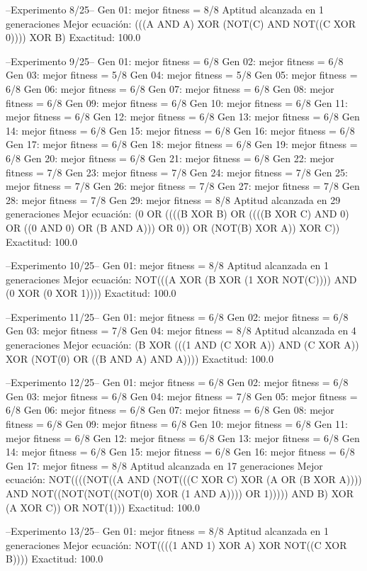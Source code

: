 --Experimento 
 8/25--
Gen 01: mejor fitness = 8/8
Aptitud alcanzada en 1 generaciones
Mejor ecuación: (((A AND A) XOR (NOT(C) AND NOT((C XOR 0)))) XOR B)
 Exactitud: 100.0%

--Experimento 
 9/25--
Gen 01: mejor fitness = 6/8
Gen 02: mejor fitness = 6/8
Gen 03: mejor fitness = 5/8
Gen 04: mejor fitness = 5/8
Gen 05: mejor fitness = 6/8
Gen 06: mejor fitness = 6/8
Gen 07: mejor fitness = 6/8
Gen 08: mejor fitness = 6/8
Gen 09: mejor fitness = 6/8
Gen 10: mejor fitness = 6/8
Gen 11: mejor fitness = 6/8
Gen 12: mejor fitness = 6/8
Gen 13: mejor fitness = 6/8
Gen 14: mejor fitness = 6/8
Gen 15: mejor fitness = 6/8
Gen 16: mejor fitness = 6/8
Gen 17: mejor fitness = 6/8
Gen 18: mejor fitness = 6/8
Gen 19: mejor fitness = 6/8
Gen 20: mejor fitness = 6/8
Gen 21: mejor fitness = 6/8
Gen 22: mejor fitness = 7/8
Gen 23: mejor fitness = 7/8
Gen 24: mejor fitness = 7/8
Gen 25: mejor fitness = 7/8
Gen 26: mejor fitness = 7/8
Gen 27: mejor fitness = 7/8
Gen 28: mejor fitness = 7/8
Gen 29: mejor fitness = 8/8
Aptitud alcanzada en 29 generaciones
Mejor ecuación: (0 OR ((((B XOR B) OR ((((B XOR C) AND 0) OR ((0 AND 0) OR (B AND A))) OR 0)) OR (NOT(B) XOR A)) XOR C))
 Exactitud: 100.0%

--Experimento 
 10/25--
Gen 01: mejor fitness = 8/8
Aptitud alcanzada en 1 generaciones
Mejor ecuación: NOT(((A XOR (B XOR (1 XOR NOT(C)))) AND (0 XOR (0 XOR 1))))
 Exactitud: 100.0%

--Experimento 
 11/25--
Gen 01: mejor fitness = 6/8
Gen 02: mejor fitness = 6/8
Gen 03: mejor fitness = 7/8
Gen 04: mejor fitness = 8/8
Aptitud alcanzada en 4 generaciones
Mejor ecuación: (B XOR (((1 AND (C XOR A)) AND (C XOR A)) XOR (NOT(0) OR ((B AND A) AND A))))
 Exactitud: 100.0%

--Experimento 
 12/25--
Gen 01: mejor fitness = 6/8
Gen 02: mejor fitness = 6/8
Gen 03: mejor fitness = 6/8
Gen 04: mejor fitness = 7/8
Gen 05: mejor fitness = 6/8
Gen 06: mejor fitness = 6/8
Gen 07: mejor fitness = 6/8
Gen 08: mejor fitness = 6/8
Gen 09: mejor fitness = 6/8
Gen 10: mejor fitness = 6/8
Gen 11: mejor fitness = 6/8
Gen 12: mejor fitness = 6/8
Gen 13: mejor fitness = 6/8
Gen 14: mejor fitness = 6/8
Gen 15: mejor fitness = 6/8
Gen 16: mejor fitness = 6/8
Gen 17: mejor fitness = 8/8
Aptitud alcanzada en 17 generaciones
Mejor ecuación: NOT((((NOT((A AND (NOT(((C XOR C) XOR (A OR (B XOR A)))) AND NOT((NOT(NOT((NOT(0) XOR (1 AND A)))) OR 1))))) AND B) XOR (A XOR C)) OR NOT(1)))
 Exactitud: 100.0%

--Experimento 
 13/25--
Gen 01: mejor fitness = 8/8
Aptitud alcanzada en 1 generaciones
Mejor ecuación: NOT((((1 AND 1) XOR A) XOR NOT((C XOR B))))
 Exactitud: 100.0%

